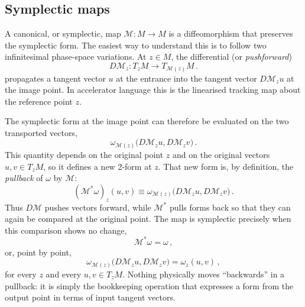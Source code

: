 \subsection{Symplectic maps}
A canonical, or symplectic, map $\mathcal{M}:M\to M$ is a diffeomorphism
that preserves the symplectic form.  The easiest way to understand this is to
follow two infinitesimal phase-space variations.  At $z\in M$, the
differential (or \emph{pushforward})
\begin{equation}\label{eq:pushforward}
    D\mathcal{M}_z:T_zM\longrightarrow T_{\mathcal{M}(z)}M\,.
\end{equation}
propagates a tangent vector $u$ at the entrance into the tangent vector
$D\mathcal M_z u$ at the image point.  In accelerator language this is the
linearised tracking map about the reference point $z$.

The symplectic form at the image point can therefore be evaluated on the two
transported vectors,
\begin{equation}
    \omega_{\mathcal M(z)}
    \bigl(D\mathcal M_z u,D\mathcal M_z v\bigr)\,.
\end{equation}
This quantity depends on the original point $z$ and on the original vectors
$u,v\in T_zM$, so it defines a new 2-form at $z$.  That new form is, by
definition, the \emph{pullback} of $\omega$ by $\mathcal M$:
\begin{equation}\label{eq:pullback-two-form}
    (\mathcal M^*\omega)_z(u,v)
    \equiv
    \omega_{\mathcal M(z)}
    \bigl(D\mathcal M_z u,D\mathcal M_z v\bigr)\,.
\end{equation}
Thus $D\mathcal M$ pushes vectors forward, while $\mathcal M^*$ pulls forms
back so that they can again be compared at the original point.  The map is
symplectic precisely when this comparison shows no change,
\begin{equation}\label{eq:symplectic-condition}
    \mathcal M^*\omega = \omega\,,
\end{equation}
or, point by point,
\begin{equation}
    \omega_{\mathcal M(z)}
    \bigl(D\mathcal M_z u,D\mathcal M_z v\bigr) = \omega_z(u,v)\,,
\end{equation}
for every $z$ and every $u,v\in T_zM$.  Nothing physically moves ``backwards''
in a pullback: it is simply the bookkeeping operation that expresses a form
from the output point in terms of input tangent vectors.

